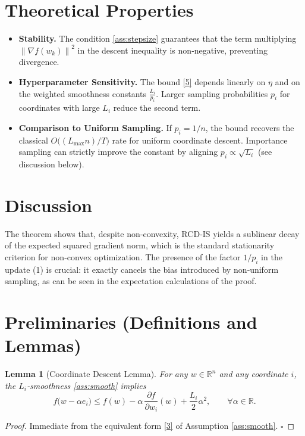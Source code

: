 \documentclass{article}
\newtheorem{lemma}{Lemma}
\newcommand{\RR}{\mathbb{R}}
\newcommand{\norm}[1]{\left\lVert #1\right\rVert}
\begin{document}
\section*{Theoretical Properties}
\begin{itemize}
\item \textbf{Stability.} The condition \eqref{ass:stepsize} guarantees that the term multiplying $\norm{\nabla f(w_k)}^{2}$ in the descent inequality is non‑negative, preventing divergence.
\item \textbf{Hyperparameter Sensitivity.} The bound \eqref{5} depends linearly on $\eta$ and on the weighted smoothness constants $\frac{L_i}{p_i}$. Larger sampling probabilities $p_i$ for coordinates with large $L_i$ reduce the second term.
\item \textbf{Comparison to Uniform Sampling.} If $p_i=1/n$, the bound recovers the classical $O\!\bigl((L_{\max}n)/T\bigr)$ rate for uniform coordinate descent. Importance sampling can strictly improve the constant by aligning $p_i\propto \sqrt{L_i}$ (see discussion below).
\end{itemize}

\section*{Discussion}
The theorem shows that, despite non‑convexity, RCD‑IS yields a sublinear decay of the expected squared gradient norm, which is the standard stationarity criterion for non‑convex optimization. The presence of the factor $1/p_i$ in the update (1) is crucial: it exactly cancels the bias introduced by non‑uniform sampling, as can be seen in the expectation calculations of the proof.

\newpage
\section*{Preliminaries (Definitions and Lemmas)}
\begin{lemma}[Coordinate Descent Lemma]\label{lem:descent}
For any $w\in\RR^{n}$ and any coordinate $i$, the $L_i$‑smoothness \eqref{ass:smooth} implies
\[
f\!\bigl(w-\alpha e_i\bigr)
\le f(w)-\alpha\,\frac{\partial f}{\partial w_i}(w)+\frac{L_i}{2}\alpha^{2},
\qquad\forall\alpha\in\RR .
\tag{6}
\]
\end{lemma}
\begin{proof}
Immediate from the equivalent form \eqref{3} of Assumption \ref{ass:smooth}. \hfill $\square$
\end{proof}
\end{document}
